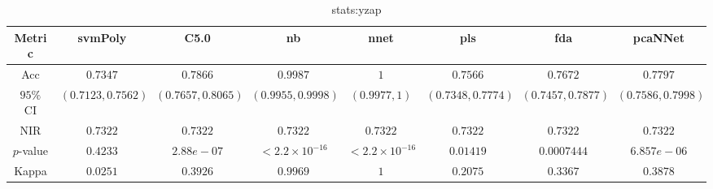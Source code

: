 \begin{table}[!ht]
	\centering
	\begin{tabular}{|c|c|c|c|c|c|c|c|}
		\hline
		Metric & svmPoly & C5.0 & nb & nnet & pls & fda & pcaNNet \\ \hline
		Acc & $0.7347$ & $0.7866$ & $0.9987$ & $1$ & $0.7566$ & $0.7672$ & $0.7797$ \\ \hline
		$95\%$ CI & $(0.7123, 0.7562)$ & $(0.7657, 0.8065)$ & $(0.9955, 0.9998)$ & $(0.9977, 1)$ & $(0.7348, 0.7774)$ & $(0.7457, 0.7877)$ & $(0.7586, 0.7998)$ \\ \hline
		NIR & $0.7322$ & $0.7322$ & $0.7322$ & $0.7322$ & $0.7322$ & $0.7322$ & $0.7322$ \\ \hline
		$p$-value & $0.4233$ & $2.88e-07$ & $< 2.2 \times {10}^{-16}$ & $< 2.2 \times {10}^{-16}$ & $0.01419$ & $0.0007444$ & $6.857e-06$ \\ \hline
		Kappa & $0.0251$ & $0.3926$ & $0.9969$ & $1$ & $0.2075$ & $0.3367$ & $0.3878$ \\ \hline
	\end{tabular}
	\caption{stats:yzap}
	\label{tab:stats:yzap}
\end{table}
